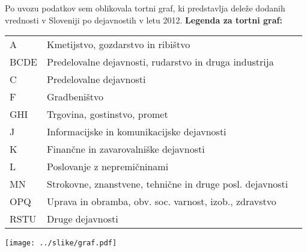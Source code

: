 \documentclass[a4paper, 11pt]{article}
\begin{document}
Po uvozu podatkov sem oblikovala tortni graf, ki predstavlja deleže dodanih vrednosti v Sloveniji po dejavnostih v letu 2012.
\newpage
\textbf{Legenda za tortni graf:}
\begin{table}[h]
\begin{tabular}{lll}
A & Kmetijstvo, gozdarstvo in ribištvo \\
BCDE & Predelovalne dejavnosti, rudarstvo in druga industrija \\
C & Predelovalne dejavnosti \\
F & Gradbeništvo \\
GHI & Trgovina, gostinstvo, promet \\
J & Informacijske in komunikacijske dejavnosti\\
K & Finančne in zavarovalniške dejavnosti\\
L & Poslovanje z nepremičninami \\
MN & Strokovne, znanstvene, tehnične in druge posl. dejavnosti \\
OPQ & Uprava in obramba, obv. soc. varnost, izob., zdravstvo \\
RSTU & Druge dejavnosti
\end{tabular}
\end{table}

\begin{center}
\texttt{[image: ../slike/graf.pdf]}
\end{center}
\end{document}
